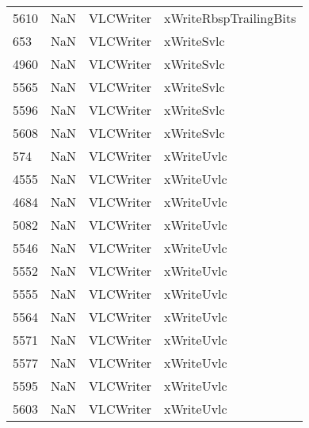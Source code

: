 \begin{tabular}{llll}
5610 &                   NaN &                  VLCWriter &                    xWriteRbspTrailingBits \\
653  &                   NaN &                  VLCWriter &                                xWriteSvlc \\
4960 &                   NaN &                  VLCWriter &                                xWriteSvlc \\
5565 &                   NaN &                  VLCWriter &                                xWriteSvlc \\
5596 &                   NaN &                  VLCWriter &                                xWriteSvlc \\
5608 &                   NaN &                  VLCWriter &                                xWriteSvlc \\
574  &                   NaN &                  VLCWriter &                                xWriteUvlc \\
4555 &                   NaN &                  VLCWriter &                                xWriteUvlc \\
4684 &                   NaN &                  VLCWriter &                                xWriteUvlc \\
5082 &                   NaN &                  VLCWriter &                                xWriteUvlc \\
5546 &                   NaN &                  VLCWriter &                                xWriteUvlc \\
5552 &                   NaN &                  VLCWriter &                                xWriteUvlc \\
5555 &                   NaN &                  VLCWriter &                                xWriteUvlc \\
5564 &                   NaN &                  VLCWriter &                                xWriteUvlc \\
5571 &                   NaN &                  VLCWriter &                                xWriteUvlc \\
5577 &                   NaN &                  VLCWriter &                                xWriteUvlc \\
5595 &                   NaN &                  VLCWriter &                                xWriteUvlc \\
5603 &                   NaN &                  VLCWriter &                                xWriteUvlc \\

\end{tabular}

